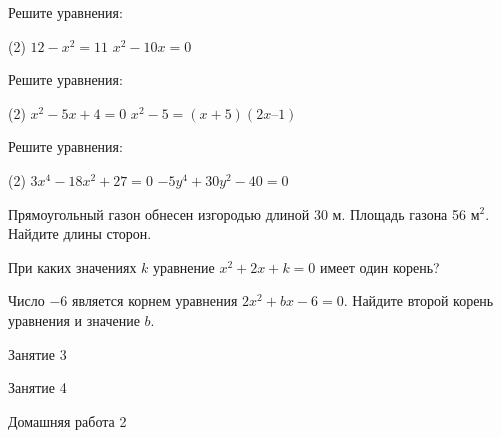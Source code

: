 \begin{homework}[number=1]
	\begin{listofex}
		\item Решите уравнения: 
		\begin{tasks}(2)
			\task \( 12 - x^{2} =11 \)
			\task \( x^{2} - 10x =0 \)
		\end{tasks}
		\item Решите уравнения: 
		\begin{tasks}(2)
			\task \(  x^{2} - 5x+4=0 \)
			\task \(  x^{2} - 5 =(x+5)(2x – 1)\)
		\end{tasks}
		\item Решите уравнения: 
		\begin{tasks}(2)
			\task \(  3x^{4}-18x^{2}+27=0 \)
			\task \(  -5y^{4}+30y^{2}-40=0\)
		\end{tasks}
		\item Прямоугольный газон обнесен изгородью длиной 30 м. Площадь газона 56 м\( ^{2} \). Найдите длины сторон. 
		\item При каких значениях \( k \) уравнение \( x^{2} + 2x + k = 0 \)  имеет один  корень?
		\item Число \( -6 \) является корнем уравнения \( 2x^{2} + bx - 6 = 0 \). Найдите второй корень уравнения и значение \( b \).
	\end{listofex}
\end{homework}

\begin{class}[number=3]
	\begin{listofex}
		\item Занятие 3 
	\end{listofex}
\end{class}

\begin{class}[number=4]
	\begin{listofex}
		\item Занятие 4
	\end{listofex}
\end{class}

\begin{homework}[number=2]
	\begin{listofex}
		\item Домашняя работа 2
	\end{listofex}
\end{homework}

